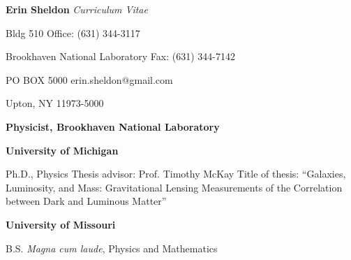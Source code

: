 \begin{center}
  {\LARGE {\bf Erin Sheldon}}
  {\large {\it Curriculum Vitae}}
\end{center}

%
%


\noindent
{Bldg 510} \hfill {Office: (631) 344-3117}

\noindent 
{Brookhaven National Laboratory} \hfill {Fax: (631) 344-7142}

\noindent
{PO BOX 5000} \hfill {erin.sheldon@gmail.com}

\noindent
{Upton, NY 11973-5000} %








\ssp
\ssp
\noindent
{}
{\bf Physicist, Brookhaven National Laboratory}
\newline
\makebox[1.25in][l]{}{~~~~~~~~~~~~~~~~~~~~~~~~~~~~~}
	\hfill



\ssp
\ssp
\noindent
{}
{\bf University of Michigan}
\hfill
{}
\normalsize

\tsp
\noindent
\makebox[1.25in][l]{}
\parbox{5.40in}{
Ph.D., Physics\newline
Thesis advisor: Prof. Timothy McKay\newline
Title of thesis: ``Galaxies, Luminosity, and Mass: Gravitational Lensing Measurements of the Correlation between Dark and Luminous Matter''
}

\isp
\noindent
\makebox[1.25in][l]{}
{\bf University of Missouri}
\hfill
{}
\normalsize

\tsp
\noindent
\makebox[1.25in][l]{}
\parbox{5.40in}{B.S. {\it Magna cum laude}, Physics and Mathematics}

%
%

